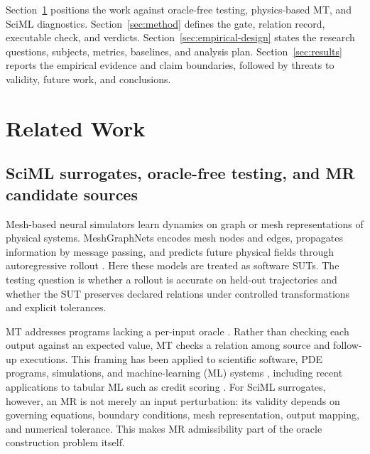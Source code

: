 \documentclass[preprint,12pt,authoryear]{elsarticle}
\begin{document}
Section~\ref{sec:related} positions the work against oracle-free testing, physics-based MT, and SciML diagnostics. Section~\ref{sec:method} defines the gate, relation record, executable check, and verdicts. Section~\ref{sec:empirical-design} states the research questions, subjects, metrics, baselines, and analysis plan. Section~\ref{sec:results} reports the empirical evidence and claim boundaries, followed by threats to validity, future work, and conclusions.

\section{Related Work}
\label{sec:related}

\subsection{SciML surrogates, oracle-free testing, and MR candidate sources}
\label{subsec:mesh-simulation}
\label{subsec:mt-oracle}
\label{subsec:mr-identification}

Mesh-based neural simulators learn dynamics on graph or mesh representations of physical systems. MeshGraphNets encodes mesh nodes and edges, propagates information by message passing, and predicts future physical fields through autoregressive rollout \citep{pfaff2021meshgraphnets}. Here these models are treated as software SUTs. The testing question is whether a rollout is accurate on held-out trajectories and whether the SUT preserves declared relations under controlled transformations and explicit tolerances.

MT addresses programs lacking a per-input oracle \citep{chen1998metamorphic,segura2016survey,chen2018mtSurvey}. Rather than checking each output against an expected value, MT checks a relation among source and follow-up executions. This framing has been applied to scientific software, PDE programs, simulations, and machine-learning (ML) systems \citep{chen2002pde,chen2011ml,kanewala2019scientific,olsen2019simulation}, including recent applications to tabular ML such as credit scoring \citep{ying2025}. For SciML surrogates, however, an MR is not merely an input perturbation: its validity depends on governing equations, boundary conditions, mesh representation, output mapping, and numerical tolerance. This makes MR admissibility part of the oracle construction problem itself.
\end{document}

